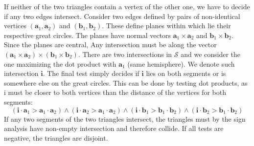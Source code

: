 If neither of the two triangles contain a vertex of the other one, we have to decide if any two edges intersect. Consider two edges defined by pairs of non-identical vertices $(\mathbf{a}_1, \mathbf{a}_2)$ and $(\mathbf{b}_1, \mathbf{b}_2)$. These define planes within which lie their respective great circles. The planes have normal vectors $\mathbf{a}_1 \times \mathbf{a}_2$ and $\mathbf{b}_1 \times \mathbf{b}_2$. Since the planes are central, Any intersection must be along the vector $(\mathbf{a}_1 \times \mathbf{a}_2)\times(\mathbf{b}_1 \times \mathbf{b}_2)$. There are two intersections in $\mathcal{S}$ and we consider the one maximizing the dot product with $\mathbf{a}_1$ (same hemisphere). We denote such intersection $\mathbf{i}$. The final test simply decides if $\mathbf{i}$ lies on both segments or is somewhere else on the great circles. This can be done by testing dot products, as i must be closer to both vertices than the distance of the vertices for both segments:
$$(\mathbf{i}\cdot\mathbf{a}_1 > \mathbf{a}_1\cdot\mathbf{a}_2) \land (\mathbf{i}\cdot\mathbf{a}_2 > \mathbf{a}_1\cdot\mathbf{a}_2)\land(\mathbf{i}\cdot\mathbf{b}_1 > \mathbf{b}_1\cdot\mathbf{b}_2) \land (\mathbf{i}\cdot\mathbf{b}_2 > \mathbf{b}_1\cdot\mathbf{b}_2)$$
If any two segments of the two triangles intersect, the triangles must by the sign analysis have non-empty intersection and therefore collide. If all tests are negative, the triangles are disjoint.
